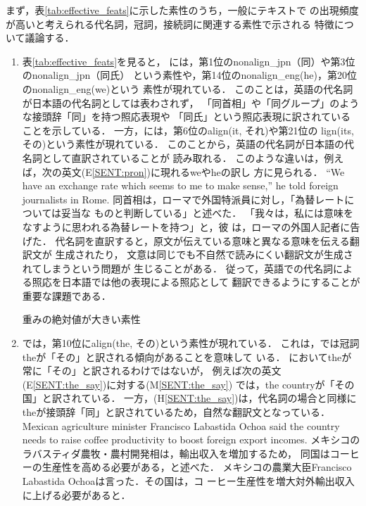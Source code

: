 \documentclass[japanese]{jnlp_1.4}
\newcommand{\AL}{}
\newcommand{\NAL}{}
\newcommand{\HUM}{}
\newcommand{\MT}{}
\newcommand{\MTS}{}
\newenvironment{SENT2}{}{}
\begin{document}
まず，表\ref{tab:effective_feats}に示した素性のうち，一般にテキストで
の出現頻度が高いと考えられる代名詞，冠詞，接続詞に関連する素性で示される
特徴について議論する．
\begin{enumerate}
\item
表\ref{tab:effective_feats}を見ると，
{\HUM}には，第1位の{\NAL}nonalign\_jpn（同）や第3位のnonalign\_jpn（同氏）
という素性や，第14位のnonalign\_eng(he)，第20位のnonalign\_eng(we)という
素性が現れている．
このことは，英語の代名詞が日本語の代名詞としては表わされず，
「同首相」や「同グループ」のような接頭辞「同」を持つ照応表現や
「同氏」という照応表現に訳されていることを示している．
一方，{\MTS}には，第6位の{\AL}align(it, それ)や第21位の
lign(its, その)という素性が現れている．
このことから，英語の代名詞が日本語の代名詞として直訳されていることが
読み取れる．
このような違いは，例えば，次の英文(E\ref{SENT:pron})に現れるweやheの訳し
方に見られる．
\begin{SENT2}
\sentE ``We have an exchange rate which seems to me to make sense,'' he 
told foreign journalists in Rome. 
\sentH 同首相は，ローマで外国特派員に対し，「為替レートについては妥当な
ものと判断している」と述べた．
\sentM 「我々は，私には意味をなすように思われる為替レートを持つ」と，彼
は，ローマの外国人記者に告げた．
\label{SENT:pron}
\end{SENT2}
代名詞を直訳すると，原文が伝えている意味と異なる意味を伝える翻訳文が
生成されたり，
文意は同じでも不自然で読みにくい翻訳文が生成されてしまうという問題が
生じることがある． 
従って，英語での代名詞による照応を日本語では他の表現による照応として
翻訳できるようにすることが重要な課題である\cite{Yoshimi01a}．

\begin{table}[t]
\caption{重みの絶対値が大きい素性}
\label{tab:effective_feats}

\end{table}


\item
{\MTS}では，第10位にalign(the, その)という素性が現れている．
これは，{\MTS}では冠詞theが「その」と訳される傾向があることを意味して
いる．
{\MTS}においてtheが常に「その」と訳されるわけではないが，
例えば次の英文(E\ref{SENT:the_say})に対する{\MT}(M\ref{SENT:the_say})
では，the countryが「その国」と訳されている．
一方，{\HUM}(H\ref{SENT:the_say})は，代名詞の場合と同様に
theが接頭辞「同」と訳されているため，自然な翻訳文となっている．
\begin{SENT2}
\sentE Mexican agriculture minister Francisco Labastida Ochoa said the 
country needs to raise coffee productivity to boost foreign export 
incomes.
\sentH メキシコのラバスティダ農牧・農村開発相は，輸出収入を増加するため，
同国はコーヒーの生産性を高める必要がある，と述べた．
\sentM メキシコの農業大臣Francisco Labastida Ochoaは言った．その国は，コ
ーヒー生産性を増大対外輸出収入に上げる必要があると．
\label{SENT:the_say}
\end{SENT2}


\end{enumerate}
\end{document}
